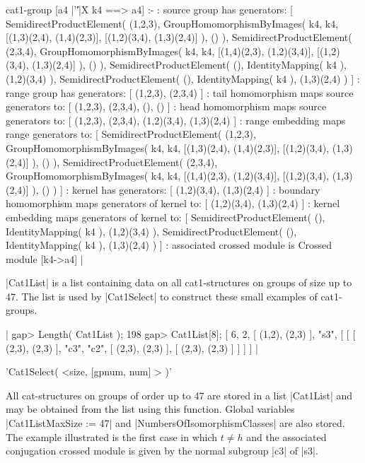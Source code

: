     cat1-group [a4 |'\|'|X k4 ==> a4] :- 
    : source group has generators:
      [ SemidirectProductElement( (1,2,3), GroupHomomorphismByImages( k4,
         k4, [(1,3)(2,4), (1,4)(2,3)], [(1,2)(3,4), (1,3)(2,4)] ), () ), 
        SemidirectProductElement( (2,3,4), GroupHomomorphismByImages( k4, 
         k4, [(1,4)(2,3), (1,2)(3,4)], [(1,2)(3,4), (1,3)(2,4)] ), () ), 
        SemidirectProductElement( (), IdentityMapping( k4 ), (1,2)(3,4) ), 
        SemidirectProductElement( (), IdentityMapping( k4 ), (1,3)(2,4) ) ]
    :  range group has generators:
      [ (1,2,3), (2,3,4) ]
    : tail homomorphism maps source generators to:
      [ (1,2,3), (2,3,4), (), () ]
    : head homomorphism maps source generators to:
      [ (1,2,3), (2,3,4), (1,2)(3,4), (1,3)(2,4) ]
    : range embedding maps range generators to:
      [ SemidirectProductElement( (1,2,3), GroupHomomorphismByImages( k4,
         k4, [(1,3)(2,4), (1,4)(2,3)], [(1,2)(3,4), (1,3)(2,4)] ), () ), 
        SemidirectProductElement( (2,3,4), GroupHomomorphismByImages( k4,
         k4, [(1,4)(2,3), (1,2)(3,4)], [(1,2)(3,4), (1,3)(2,4)] ), () ) ]
    : kernel has generators:
      [ (1,2)(3,4), (1,3)(2,4) ]
    : boundary homomorphism maps generators of kernel to:
      [ (1,2)(3,4), (1,3)(2,4) ]
    : kernel embedding maps generators of kernel to:
      [ SemidirectProductElement( (), IdentityMapping( k4 ), (1,2)(3,4) ), 
        SemidirectProductElement( (), IdentityMapping( k4 ), (1,3)(2,4) ) ]
    : associated crossed module is Crossed module [k4->a4]   |

%

|Cat1List| is a list containing data on all cat1-structures on groups 
of size up to 47.  The list is used by |Cat1Select| to construct these
small examples of cat1-groups.

|    gap> Length( Cat1List );
    198
    gap> Cat1List[8];
    [ 6, 2, [ (1,2), (2,3) ], "s3", 
            [ [ [ (2,3), (2,3) ], "c3", "c2", [ (2,3), (2,3) ], 
            [ (2,3), (2,3) ] ] ] ]  |

%

'Cat1Select( <size, [gpnum, num] > )'

All cat-structures on groups of order up to 47 are stored in a list
|Cat1List| and may be obtained from the list using this function.
Global variables |Cat1ListMaxSize := 47| and
|NumbersOfIsomorphismClasses| are also stored.
The example illustrated is the first case in which $t \ne h$
and the associated conjugation crossed module is given by
the normal subgroup |c3| of |s3|.
 
